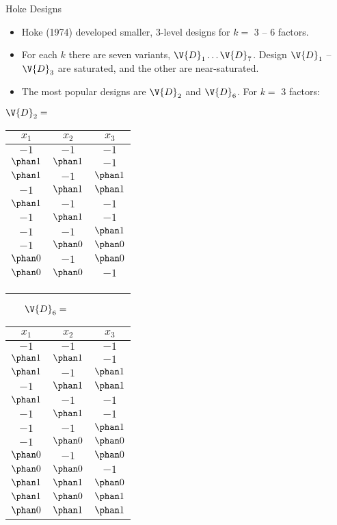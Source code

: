 \documentclass[9pt]{beamer}
\newcommand\lo{$-1$}
\newcommand\hi{$\phan1$}
\newcommand\ze{$\phan0$}
\begin{document}
\begin{frame}{Hoke Designs}
\begin{itemize}
	\item Hoke (1974) developed smaller, 3-level designs for $k=$ 3 -- 6 factors.
	\item For each $k$ there are seven variants, $\V{D}_1 \ldots \V{D}_7$. Design $\V{D}_1$ -- $\V{D}_3$ are saturated, and the other are near-saturated.
	\item The most popular designs are $\V{D}_2$ and $\V{D}_6$. For $k=$ 3 factors:
\end{itemize}

\bigskip
\begin{center}
{\small 
$\V{D}_2 = $
\begin{tabular}{ccc}
	\toprule
	$x_1$ & $x_2$ & $x_3$ \\
	\midrule
	\lo & \lo & \lo \\
	\hi & \hi & \lo \\
	\hi & \lo & \hi \\
	\lo & \hi & \hi \\
	\hi & \lo & \lo \\
	\lo & \hi & \lo \\
	\lo & \lo & \hi \\
	\lo & \ze & \ze \\
	\ze & \lo & \ze \\
	\ze & \ze & \lo \\
	\bottomrule
	\\
	\\
	\\
\end{tabular}
$\quad\quad \V{D}_6 = $
\begin{tabular}{ccc}
	\toprule
	$x_1$ & $x_2$ & $x_3$ \\
	\midrule
	\lo & \lo & \lo \\
	\hi & \hi & \lo \\
	\hi & \lo & \hi \\
	\lo & \hi & \hi \\
	\hi & \lo & \lo \\
	\lo & \hi & \lo \\
	\lo & \lo & \hi \\
	\lo & \ze & \ze \\
	\ze & \lo & \ze \\
	\ze & \ze & \lo \\
	\hi & \hi & \ze \\
	\hi & \ze & \hi \\
	\ze & \hi & \hi \\
	\bottomrule
\end{tabular}

}\end{center}

\end{frame}
\end{document}
